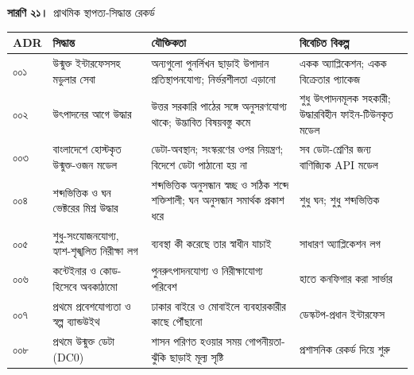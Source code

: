 \documentclass[border=10pt]{standalone}
\begin{document}
\begin{minipage}{17cm}
{\large\bfseries সারণি ২১।}\ {\large প্রাথমিক স্থাপত্য-সিদ্ধান্ত রেকর্ড}\par\vspace{7pt}
\small
{}
\begin{tabularx}{\linewidth}{@{}>{\hsize=0.429\hsize\raggedright\arraybackslash}X>{\hsize=1.048\hsize\raggedright\arraybackslash}X>{\hsize=1.381\hsize\raggedright\arraybackslash}X>{\hsize=1.143\hsize\raggedright\arraybackslash}X@{}}
\arrayrulecolor{bapilrule}\toprule
\rowcolor{white}\textbf{ADR} & \textbf{সিদ্ধান্ত} & \textbf{যৌক্তিকতা} & \textbf{বিবেচিত বিকল্প} \\
\midrule
০০১ & উন্মুক্ত ইন্টারফেসসহ মডুলার সেবা & অন্যগুলো পুনর্লিখন ছাড়াই উপাদান প্রতিস্থাপনযোগ্য; নির্ভরশীলতা এড়ানো & একক অ্যাপ্লিকেশন; একক বিক্রেতার প্যাকেজ \\
০০২ & উৎপাদনের আগে উদ্ধার & উত্তর সরকারি পাঠের সঙ্গে অনুসরণযোগ্য থাকে; উদ্ভাবিত বিষয়বস্তু কমে & শুধু উৎপাদনমূলক সহকারী; উদ্ধারবিহীন ফাইন-টিউনকৃত মডেল \\
০০৩ & বাংলাদেশে হোস্টকৃত উন্মুক্ত-ওজন মডেল & ডেটা-অবস্থান; সংস্করণের ওপর নিয়ন্ত্রণ; বিদেশে ডেটা পাঠানো হয় না & সব ডেটা-শ্রেণির জন্য বাণিজ্যিক API মডেল \\
০০৪ & শব্দভিত্তিক ও ঘন ভেক্টরের মিশ্র উদ্ধার & শব্দভিত্তিক অনুসন্ধান স্বচ্ছ ও সঠিক শব্দে শক্তিশালী; ঘন অনুসন্ধান সমার্থক প্রকাশ ধরে & শুধু ঘন; শুধু শব্দভিত্তিক \\
০০৫ & শুধু-সংযোজনযোগ্য, হ্যাশ-শৃঙ্খলিত নিরীক্ষা লগ & ব্যবস্থা কী করেছে তার স্বাধীন যাচাই & সাধারণ অ্যাপ্লিকেশন লগ \\
০০৬ & কন্টেইনার ও কোড-হিসেবে অবকাঠামো & পুনরুৎপাদনযোগ্য ও নিরীক্ষাযোগ্য পরিবেশ & হাতে কনফিগার করা সার্ভার \\
০০৭ & প্রথমে প্রবেশযোগ্যতা ও স্বল্প ব্যান্ডউইথ & ঢাকার বাইরে ও মোবাইলে ব্যবহারকারীর কাছে পৌঁছানো & ডেস্কটপ-প্রধান ইন্টারফেস \\
০০৮ & প্রথমে উন্মুক্ত ডেটা (DC0) & শাসন পরিণত হওয়ার সময় গোপনীয়তা-ঝুঁকি ছাড়াই মূল্য সৃষ্টি & প্রশাসনিক রেকর্ড দিয়ে শুরু \\
\bottomrule
\end{tabularx}
\par{}
\end{minipage}
\end{document}

